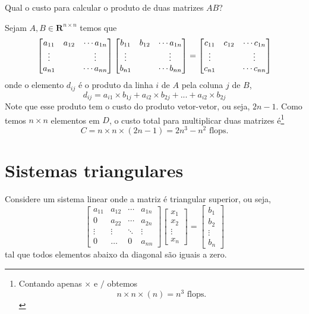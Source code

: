 \begin{ex}
Qual o custo para calcular o produto de duas matrizes  $A B$?
\end{ex}
\begin{sol}
Sejam $A, B \in \mathbf{R}^{n\times n}$ temos que 
\begin{equation}
  \begin{bmatrix} a_{11}&a_{12}&\cdots a_{1n} \\ \vdots&&\vdots \\ a_{n1}&&\cdots a_{nn} \end{bmatrix}
  \begin{bmatrix} b_{11}&b_{12}&\cdots a_{1n} \\ \vdots&&\vdots \\ b_{n1}&&\cdots b_{nn} \end{bmatrix} 
 =\begin{bmatrix} c_{11}&c_{12}&\cdots c_{1n} \\ \vdots&&\vdots \\ c_{n1}&&\cdots c_{nn} \end{bmatrix} 
\end{equation}
onde o elemento $d_{ij}$ é o produto da linha $i$ de $A$ pela coluna $j$ de $B$,
\begin{equation}
  d_{ij}=  a_{i1}\times b_{1j} + a_{i2}\times b_{2j} +...+a_{i2}\times b_{2j}
\end{equation}
Note que esse produto tem o custo do produto vetor-vetor, ou seja, $2n-1$. Como temos $n\times n$ elementos em $D$, o custo total para multiplicar duas matrizes é\footnote{Contando apenas $\times$ e $/$ obtemos
\begin{equation}
  n\times n \times(n)  = n^3 \text{~flops.}
\end{equation}
}
\begin{equation}
  C= n\times n \times (2n-1)= 2n^3-n^2 \text{~flops.}
\end{equation}

\end{sol}





\section{Sistemas triangulares}
Considere um sistema linear onde a matriz é triangular superior, ou seja, 
$$\begin{bmatrix}
a_{11} & a_{12} & \cdots & a_{1n}\\
0      & a_{22} & \cdots & a_{2n}\\
\vdots & \vdots & \ddots & \vdots\\
0      & \dots  & 0     & a_{nn}
\end{bmatrix}
\begin{bmatrix}
x_{1} \\
x_{2} \\
\vdots \\
x_{n}
\end{bmatrix} 
 =\begin{bmatrix}
b_{1} \\
b_{2} \\
\vdots \\
b_{n}
\end{bmatrix}
$$
tal que todos elementos abaixo da diagonal são iguais a zero.


